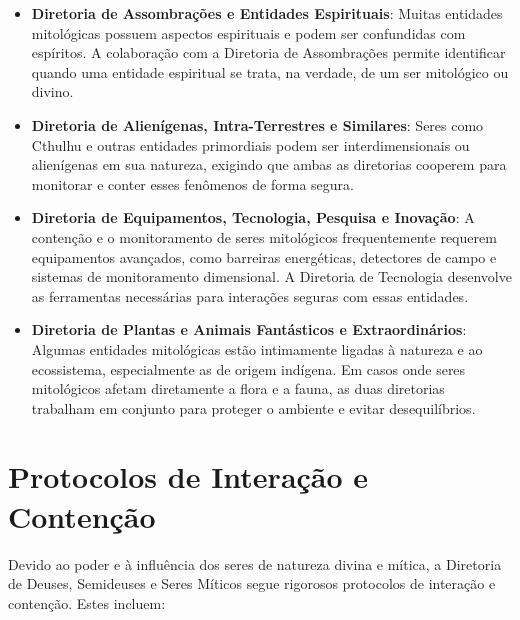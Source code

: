 \begin{itemize}
    \item \textbf{Diretoria de Assombrações e Entidades Espirituais}: Muitas entidades mitológicas possuem aspectos espirituais e podem ser confundidas com espíritos. A colaboração com a Diretoria de Assombrações permite identificar quando uma entidade espiritual se trata, na verdade, de um ser mitológico ou divino.
    \item \textbf{Diretoria de Alienígenas, Intra-Terrestres e Similares}: Seres como Cthulhu e outras entidades primordiais podem ser interdimensionais ou alienígenas em sua natureza, exigindo que ambas as diretorias cooperem para monitorar e conter esses fenômenos de forma segura.
    \item \textbf{Diretoria de Equipamentos, Tecnologia, Pesquisa e Inovação}: A contenção e o monitoramento de seres mitológicos frequentemente requerem equipamentos avançados, como barreiras energéticas, detectores de campo e sistemas de monitoramento dimensional. A Diretoria de Tecnologia desenvolve as ferramentas necessárias para interações seguras com essas entidades.
    \item \textbf{Diretoria de Plantas e Animais Fantásticos e Extraordinários}: Algumas entidades mitológicas estão intimamente ligadas à natureza e ao ecossistema, especialmente as de origem indígena. Em casos onde seres mitológicos afetam diretamente a flora e a fauna, as duas diretorias trabalham em conjunto para proteger o ambiente e evitar desequilíbrios.
\end{itemize}

\section{Protocolos de Interação e Contenção}
Devido ao poder e à influência dos seres de natureza divina e mítica, a Diretoria de Deuses, Semideuses e Seres Míticos segue rigorosos protocolos de interação e contenção. Estes incluem:

